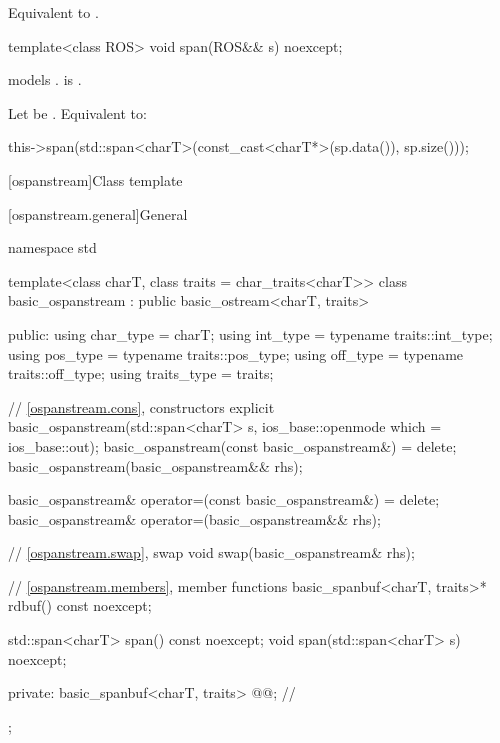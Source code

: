 \begin{itemdescr}
\pnum
\effects
Equivalent to .
\end{itemdescr}

\begin{itemdecl}
template<class ROS> void span(ROS&& s) noexcept;
\end{itemdecl}

\begin{itemdescr}
\pnum
\constraints
{} models .
is .

\pnum
\effects
Let  be .
Equivalent to:
\begin{codeblock}
this->span(std::span<charT>(const_cast<charT*>(sp.data()), sp.size()));
\end{codeblock}
\end{itemdescr}

[ospanstream]{Class template }

[ospanstream.general]{General}

%
\begin{codeblock}
namespace std {
  template<class charT, class traits = char_traits<charT>>
  class basic_ospanstream
    : public basic_ostream<charT, traits> {
  public:
    using char_type   = charT;
    using int_type    = typename traits::int_type;
    using pos_type    = typename traits::pos_type;
    using off_type    = typename traits::off_type;
    using traits_type = traits;

    // \ref{ospanstream.cons}, constructors
    explicit basic_ospanstream(std::span<charT> s,
                               ios_base::openmode which = ios_base::out);
    basic_ospanstream(const basic_ospanstream&) = delete;
    basic_ospanstream(basic_ospanstream&& rhs);

    basic_ospanstream& operator=(const basic_ospanstream&) = delete;
    basic_ospanstream& operator=(basic_ospanstream&& rhs);

    // \ref{ospanstream.swap}, swap
    void swap(basic_ospanstream& rhs);

    // \ref{ospanstream.members}, member functions
    basic_spanbuf<charT, traits>* rdbuf() const noexcept;

    std::span<charT> span() const noexcept;
    void span(std::span<charT> s) noexcept;

  private:
    basic_spanbuf<charT, traits> @@;    // \expos
  };
}
\end{codeblock}

